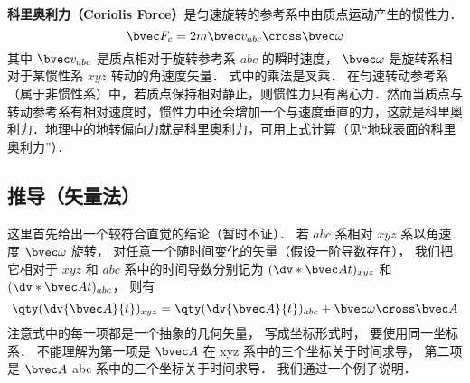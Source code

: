 

\textbf{科里奥利力（Coriolis Force）}是匀速旋转的参考系中由质点运动产生的惯性力．
\begin{equation}
\bvec F_c = 2m \bvec v_{abc} \cross \bvec \omega
\end{equation}
其中 $\bvec v_{abc}$ 是质点相对于旋转参考系 $abc$ 的瞬时速度， $\bvec\omega$ 是旋转系相对于某惯性系 $xyz$ 转动的角速度矢量．%
式中的乘法是叉乘．
在匀速转动参考系（属于非惯性系）中，若质点保持相对静止，则惯性力只有离心力．然而当质点与转动参考系有相对速度时，惯性力中还会增加一个与速度垂直的力，这就是科里奥利力．地理中的地转偏向力就是科里奥利力，可用上式计算（见“地球表面的科里奥利力”）．

\subsection{推导（矢量法）}

这里首先给出一个较符合直觉的结论（暂时不证）． 若 $abc$ 系相对 $xyz$ 系以角速度 $\bvec\omega$ 旋转， 对任意一个随时间变化的矢量（假设一阶导数存在）， 我们把它相对于 $xyz$ 和 $abc$ 系中的时间导数分别记为 $(\dv*{\bvec A}{t})_{xyz}$ 和 $(\dv*{\bvec A}{t})_{abc}$， 则有
\begin{equation}\label{Corio_eq4}
\qty(\dv{\bvec A}{t})_{xyz} = \qty(\dv{\bvec A}{t})_{abc} + \bvec\omega\cross\bvec A
\end{equation}
注意式中的每一项都是一个抽象的几何矢量， 写成坐标形式时， 要使用同一坐标系． 不能理解为第一项是 $\bvec A$ 在 xyz 系中的三个坐标关于时间求导， 第二项是 $\bvec A$ abc 系中的三个坐标关于时间求导． 我们通过一个例子说明．

